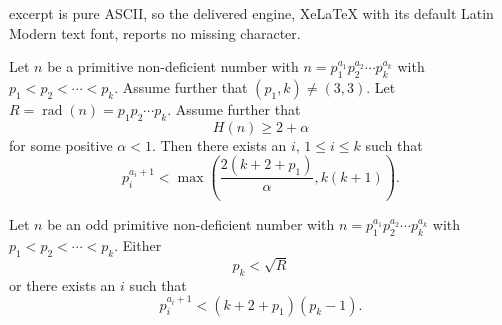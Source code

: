 \documentclass[10pt,a4paper]{amsart}
\DeclareMathOperator{\rad}{rad}
\begin{document}
excerpt is pure ASCII, so the delivered engine, XeLaTeX with its default Latin Modern text font, reports no missing character.
\begin{lemma}\label{GeneralizedPuchtalemma} Let $n$ be a primitive non-deficient number with $n=p_1^{a_1}p_2^{a_2} \cdots p_k^{a_k}$ with $p_1 < p_2 < \cdots < p_k$. Assume further that $(p_1,k) \neq (3,3)$. Let $R=\rad(n) = p_1p_2\cdots p_k$. Assume further that $$H(n) \geq 2 + \alpha$$ for some positive $\alpha <1$. Then there exists an $i$, $1 \leq i \leq k$ such that 
$$p_i^{a_i+1} < \max\left(\frac{2(k+2+p_1)}{\alpha },k(k+1)\right).$$
\end{lemma}

\begin{proposition}  Let $n$ be an odd  primitive non-deficient number with $n=p_1^{a_1}p_2^{a_2} \cdots p_k^{a_k}$ with $p_1 < p_2 < \cdots < p_k$.
Either \begin{equation}p_k < \sqrt{R}\label{pklessthansquarerootofR}\end{equation} or there exists an $i$ such that \begin{equation}p_i^{a_i+1} < (k+2+p_1)(p_k-1).\label{mincomponentnotmuchbiggerthanlargestprimefactor}\end{equation}\label{dichotomywithpk}
\end{proposition}
\end{document}
